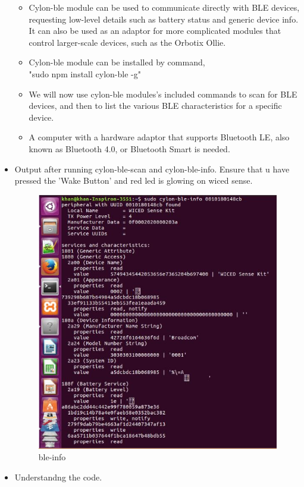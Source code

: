 \documentclass[11pt,a4paper]{article}
\begin{document}
\begin{itemize}
\begin{itemize}
\item Cylon-ble module can be used to communicate directly with BLE devices, requesting low-level details such as battery status and generic device info. It can also be used as an adaptor for more complicated modules that control larger-scale devices, such as the Orbotix Ollie.
\item Cylon-ble module can be installed by command,\\
"sudo npm install cylon-ble -g"
\item We will now use cylon-ble modules's included commands to scan for BLE devices, and then to list the various BLE characteristics for a specific device.
\item A computer with a hardware adaptor that supports Bluetooth LE, also known as Bluetooth 4.0, or Bluetooth Smart is needed.
\end{itemize}
\newpage
\item Output after running cylon-ble-scan and cylon-ble-info. Ensure that u have pressed the 'Wake Button' and red led is glowing on wiced sense.
\begin{figure}[h]
    \centering
	\includegraphics[scale=0.8]{info.JPG}
	\caption{ble-info}
	\end{figure}
\newpage
\item Understandng the code.

\end{itemize}
\end{document}
